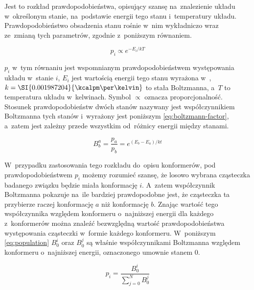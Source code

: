 Jest to rozkład prawdopodobieństwa, opisujący szansę na~znalezienie układu w~określonym stanie,
  na~podstawie energii tego stanu i~temperatury układu.
Prawdopodobieństwo obsadzenia stanu rośnie w~nim wykładniczo wraz ze~zmianą tych parametrów,
  zgodnie z~poniższym równaniem.

\begin{equation}
  p_i \propto e^{-E_i/kT}
\end{equation}

$p_i$ w~tym równaniu jest wspomnianym prawdopodobieństwem występowania układu w~stanie $i$,
  $E_i$ jest wartością energii tego stanu wyrażona w~\si{\kcalpm},
  $k = \SI{0.001987204}{\kcalpm\per\kelvin}$ to stała Boltzmanna,
  a~$T$ to temperatura układu w~kelwinach.
Symbol $\propto$ oznacza proporcjonalność.
Stosunek prawdopodobieństw dwóch stanów nazywany jest współczynnikiem Boltzmanna tych stanów
  i~wyrażony jest poniższym \cref{eq:boltzmann-factor}, a~zatem jest zależny przede wszystkim
  od~różnicy energii między stanami.

\begin{equation}\label{eq:boltzmann-factor}
  B^a_b = \frac{p_a}{p_b} = e^{(E_b-E_a)/kt}
\end{equation}

W~przypadku zastosowania tego rozkładu do~opisu konformerów, pod prawdopodobieństwem $p_i$
  możemy rozumieć szansę, że losowo wybrana cząsteczka badanego związku będzie miała
  konformację $i$.
A~zatem współczynnik Boltzmanna pokazuje na~ile bardziej prawdopodobne jest, że cząsteczka
  ta przybierze raczej konformację $a$ niż konformację $b$.
Znając wartość tego współczynnika względem konformeru o~najniższej energii dla każdego
  z~konformerów można znaleźć bezwzględną wartość prawdopodobieństwa występowania cząsteczki
  w~formie każdego konformeru.
W~poniższym \cref{eq:population} $B^i_0$ oraz $B^j_0$ są właśnie współczynnikami Boltzmanna względem
  konformeru o~najniższej energii, oznaczonego umownie stanem $0$.

\begin{equation}\label{eq:population}
  p_i = \frac{B^i_0}{\sum\limits^N_{j=0}B^j_0}
\end{equation}

